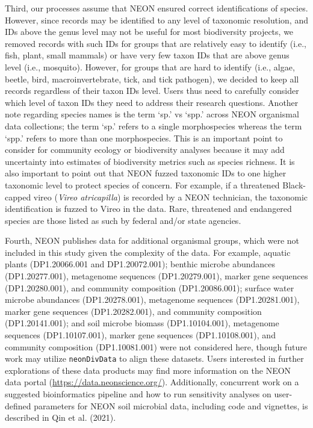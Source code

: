 \documentclass[
  12pt,
]{article}
\begin{document}
Third, our processes assume that NEON ensured correct identifications of species. However, since records may be identified to any level of taxonomic resolution, and IDs above the genus level may not be useful for most biodiversity projects, we removed records with such IDs for groups that are relatively easy to identify (i.e., fish, plant, small mammals) or have very few taxon IDs that are above genus level (i.e., mosquito). However, for groups that are hard to identify (i.e., algae, beetle, bird, macroinvertebrate, tick, and tick pathogen), we decided to keep all records regardless of their taxon IDs level. Users thus need to carefully consider which level of taxon IDs they need to address their research questions. Another note regarding species names is the term `sp.' vs `spp.' across NEON organismal data collections; the term `sp.' refers to a single morphospecies whereas the term `spp.' refers to more than one morphospecies. This is an important point to consider for community ecology or biodiversity analyses because it may add uncertainty into estimates of biodiversity metrics such as species richness. It is also important to point out that NEON fuzzed taxonomic IDs to one higher taxonomic level to protect species of concern. For example, if a threatened Black-capped vireo (\emph{Vireo atricapilla}) is recorded by a NEON technician, the taxonomic identification is fuzzed to Vireo in the data. Rare, threatened and endangered species are those listed as such by federal and/or state agencies.

Fourth, NEON publishes data for additional organismal groups, which were not included in this study given the complexity of the data. For example, aquatic plants (DP1.20066.001 and DP1.20072.001); benthic microbe abundances (DP1.20277.001), metagenome sequences (DP1.20279.001), marker gene sequences (DP1.20280.001), and community composition (DP1.20086.001); surface water microbe abundances (DP1.20278.001), metagenome sequences (DP1.20281.001), marker gene sequences (DP1.20282.001), and community composition (DP1.20141.001); and soil microbe biomass (DP1.10104.001), metagenome sequences (DP1.10107.001), marker gene sequences (DP1.10108.001), and community composition (DP1.10081.001) were not considered here, though future work may utilize \texttt{neonDivData} to align these datasets. Users interested in further explorations of these data products may find more information on the NEON data portal (\url{https://data.neonscience.org/}). Additionally, concurrent work on a suggested bioinformatics pipeline and how to run sensitivity analyses on user-defined parameters for NEON soil microbial data, including code and vignettes, is described in Qin et al. (2021).
\end{document}
